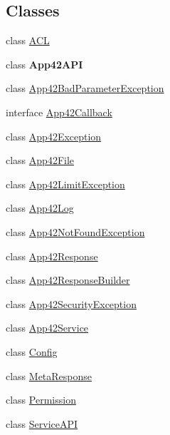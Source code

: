 \subsection*{Classes}
\begin{DoxyCompactItemize}
\item 
class \hyperlink{classcom_1_1shephertz_1_1app42_1_1paas_1_1sdk_1_1windows_1_1_a_c_l}{A\+C\+L}
\item 
class {\bfseries App42\+A\+P\+I}
\item 
class \hyperlink{classcom_1_1shephertz_1_1app42_1_1paas_1_1sdk_1_1windows_1_1_app42_bad_parameter_exception}{App42\+Bad\+Parameter\+Exception}
\item 
interface \hyperlink{interfacecom_1_1shephertz_1_1app42_1_1paas_1_1sdk_1_1windows_1_1_app42_callback}{App42\+Callback}
\item 
class \hyperlink{classcom_1_1shephertz_1_1app42_1_1paas_1_1sdk_1_1windows_1_1_app42_exception}{App42\+Exception}
\item 
class \hyperlink{classcom_1_1shephertz_1_1app42_1_1paas_1_1sdk_1_1windows_1_1_app42_file}{App42\+File}
\item 
class \hyperlink{classcom_1_1shephertz_1_1app42_1_1paas_1_1sdk_1_1windows_1_1_app42_limit_exception}{App42\+Limit\+Exception}
\item 
class \hyperlink{classcom_1_1shephertz_1_1app42_1_1paas_1_1sdk_1_1windows_1_1_app42_log}{App42\+Log}
\item 
class \hyperlink{classcom_1_1shephertz_1_1app42_1_1paas_1_1sdk_1_1windows_1_1_app42_not_found_exception}{App42\+Not\+Found\+Exception}
\item 
class \hyperlink{classcom_1_1shephertz_1_1app42_1_1paas_1_1sdk_1_1windows_1_1_app42_response}{App42\+Response}
\item 
class \hyperlink{classcom_1_1shephertz_1_1app42_1_1paas_1_1sdk_1_1windows_1_1_app42_response_builder}{App42\+Response\+Builder}
\item 
class \hyperlink{classcom_1_1shephertz_1_1app42_1_1paas_1_1sdk_1_1windows_1_1_app42_security_exception}{App42\+Security\+Exception}
\item 
class \hyperlink{classcom_1_1shephertz_1_1app42_1_1paas_1_1sdk_1_1windows_1_1_app42_service}{App42\+Service}
\item 
class \hyperlink{classcom_1_1shephertz_1_1app42_1_1paas_1_1sdk_1_1windows_1_1_config}{Config}
\item 
class \hyperlink{classcom_1_1shephertz_1_1app42_1_1paas_1_1sdk_1_1windows_1_1_meta_response}{Meta\+Response}
\item 
class \hyperlink{classcom_1_1shephertz_1_1app42_1_1paas_1_1sdk_1_1windows_1_1_permission}{Permission}
\item 
class \hyperlink{classcom_1_1shephertz_1_1app42_1_1paas_1_1sdk_1_1windows_1_1_service_a_p_i}{Service\+A\+P\+I}
\end{DoxyCompactItemize}
